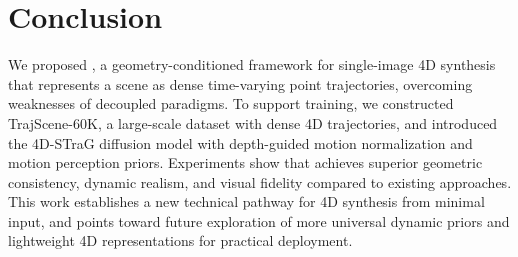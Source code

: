 \section{Conclusion}

We proposed \ours, a geometry-conditioned framework for single-image 4D synthesis that represents a scene as dense time-varying point trajectories, overcoming weaknesses of decoupled paradigms. To support training, we constructed TrajScene-60K, a large-scale dataset with dense 4D trajectories, and introduced the 4D-STraG diffusion model with depth-guided motion normalization and motion perception priors. Experiments show that \ours achieves superior geometric consistency, dynamic realism, and visual fidelity compared to existing approaches. This work establishes a new technical pathway for 4D synthesis from minimal input, and points toward future exploration of more universal dynamic priors and lightweight 4D representations for practical deployment.